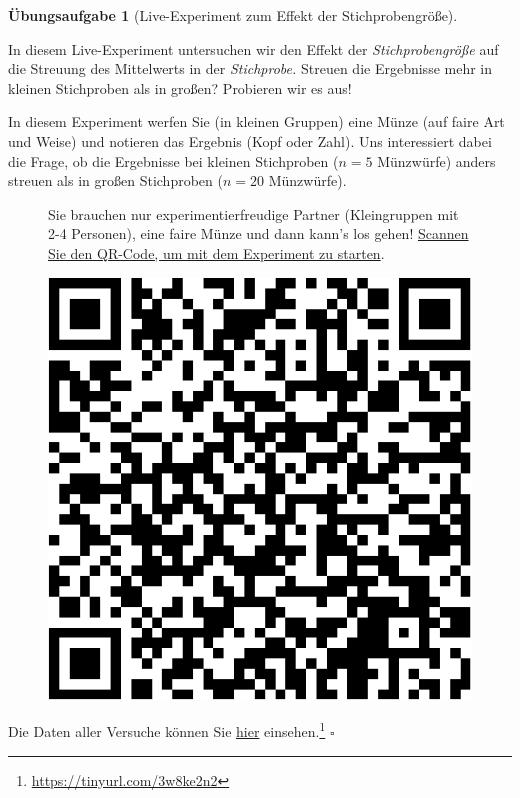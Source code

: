\documentclass[
  letterpaper,
  oneside,
  open=any]{scrbook}
\theoremstyle{definition}
\newtheorem{exercise}{Übungsaufgabe}[chapter]
\theoremstyle{definition}
\theoremstyle{definition}
\theoremstyle{remark}
\begin{document}
\begin{exercise}[Live-Experiment zum Effekt der
Stichprobengröße]\protect\hypertarget{exr-kleine-grosse-stipro}{}\label{exr-kleine-grosse-stipro}

In diesem Live-Experiment untersuchen wir den Effekt der
\emph{Stichprobengröße} auf die Streuung des Mittelwerts in der
\emph{Stichprobe.} Streuen die Ergebnisse mehr in kleinen Stichproben
als in großen? Probieren wir es aus!

In diesem Experiment werfen Sie (in kleinen Gruppen) eine Münze (auf
faire Art und Weise) und notieren das Ergebnis (Kopf oder Zahl). Uns
interessiert dabei die Frage, ob die Ergebnisse bei kleinen Stichproben
(\(n=5\) Münzwürfe) anders streuen als in großen Stichproben (\(n=20\)
Münzwürfe).

\begin{figure}

\begin{minipage}{0.80\linewidth}
Sie brauchen nur experimentierfreudige Partner (Kleingruppen mit 2-4
Personen), eine faire Münze und dann kann's los gehen!
\href{https://docs.google.com/forms/d/e/1FAIpQLSeAwqNyZtyQwttq5JrQdQ2AO7w5vzcVDXjiejKnyFNxiWtEag/viewform?usp=sf_link}{Scannen
Sie den QR-Code, um mit dem Experiment zu starten}.\end{minipage}%
%
\begin{minipage}{0.20\linewidth}

\begin{center}
\includegraphics[width=0.75\linewidth,height=\textheight,keepaspectratio]{010-rahmen_files/figure-pdf/unnamed-chunk-17-1.pdf}
\end{center}

\end{minipage}%

\end{figure}%

Die Daten aller Versuche können Sie
\href{https://docs.google.com/spreadsheets/d/11mKFFpr-Y1CMPpq4dGA-JA_Z9jRkPbXolo54Y0G_2gE/edit?usp=sharing}{hier}
einsehen.\footnote{\url{https://tinyurl.com/3w8ke2n2}} \(\square\)

\end{exercise}
\end{document}
